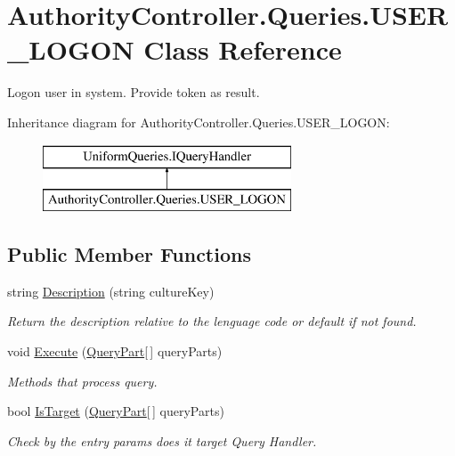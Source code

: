 \hypertarget{class_authority_controller_1_1_queries_1_1_u_s_e_r___l_o_g_o_n}{}\section{Authority\+Controller.\+Queries.\+U\+S\+E\+R\+\_\+\+L\+O\+G\+ON Class Reference}
\label{class_authority_controller_1_1_queries_1_1_u_s_e_r___l_o_g_o_n}


Logon user in system. Provide token as result.  


Inheritance diagram for Authority\+Controller.\+Queries.\+U\+S\+E\+R\+\_\+\+L\+O\+G\+ON\+:\begin{figure}[H]
\begin{center}
\leavevmode
\includegraphics[height=2.000000cm]{de/d4c/class_authority_controller_1_1_queries_1_1_u_s_e_r___l_o_g_o_n}
\end{center}
\end{figure}
\subsection*{Public Member Functions}
\begin{DoxyCompactItemize}
\item 
string \mbox{\hyperlink{class_authority_controller_1_1_queries_1_1_u_s_e_r___l_o_g_o_n_af448426be46032c3ae103cdf4ea5f40b}{Description}} (string culture\+Key)
\begin{DoxyCompactList}\small\item\em Return the description relative to the lenguage code or default if not found. \end{DoxyCompactList}\item 
void \mbox{\hyperlink{class_authority_controller_1_1_queries_1_1_u_s_e_r___l_o_g_o_n_a001f81c71597259636be777078e50f7e}{Execute}} (\mbox{\hyperlink{struct_uniform_queries_1_1_query_part}{Query\+Part}}\mbox{[}$\,$\mbox{]} query\+Parts)
\begin{DoxyCompactList}\small\item\em Methods that process query. \end{DoxyCompactList}\item 
bool \mbox{\hyperlink{class_authority_controller_1_1_queries_1_1_u_s_e_r___l_o_g_o_n_a53261c6c60dc1a2324a67adf19f7547a}{Is\+Target}} (\mbox{\hyperlink{struct_uniform_queries_1_1_query_part}{Query\+Part}}\mbox{[}$\,$\mbox{]} query\+Parts)
\begin{DoxyCompactList}\small\item\em Check by the entry params does it target Query Handler. \end{DoxyCompactList}\end{DoxyCompactItemize}


